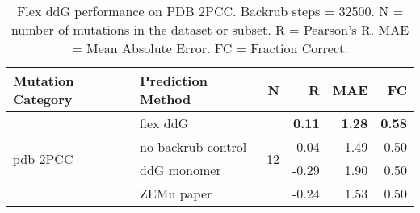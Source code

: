 \begin{table}
  \begin{tabular}{llrrrr}
\toprule
Mutation Category &   Prediction Method &   N &     R &  MAE &   FC \\
\midrule
 \multirow{ 4}{*}{pdb-2PCC} & flex ddG & \multirow{ 4}{*}{12} & \textbf{0.11} & \textbf{1.28} & \textbf{0.58}  \\
 & no backrub control & & 0.04 & 1.49 & 0.50  \\
 & ddG monomer & & -0.29 & 1.90 & 0.50  \\
 & ZEMu paper & & -0.24 & 1.53 & 0.50  \\
\bottomrule
\end{tabular}
  \caption[Flex ddG performance on PDB 2PCC]{
    Flex ddG performance on PDB 2PCC. Backrub steps = 32500. N = number of mutations in the dataset or subset. R = Pearson's R. MAE = Mean Absolute Error. FC = Fraction Correct.
  } \label{tab:table-pdb-2PCC}
\end{table}
